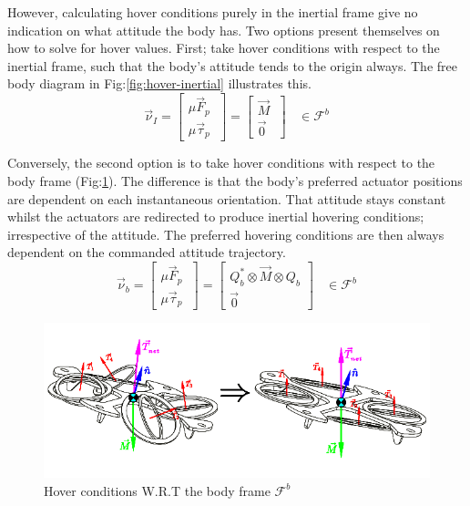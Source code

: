 \par
However, calculating hover conditions purely in the inertial frame give no indication on what attitude the body has. Two options present themselves on how to solve for hover values. First; take hover conditions with respect to the inertial frame, such that the body's attitude tends to the origin always. The free body diagram in Fig:\ref{fig:hover-inertial} illustrates this. 
\begin{equation}\label{eq:hover-inertial}
\vec{\nu}_I=
\begin{bmatrix}
\mu\vec{F}_p\hspace{3pt}\\
\mu\vec{\tau}_p\hspace{3pt}
\end{bmatrix}
=\begin{bmatrix}
\vec{M}\hspace{3pt}\\
\vec{0}\hspace{3pt}
\end{bmatrix}~~~~\in\mathcal{F}^b
\end{equation}
\par
Conversely, the second option is to take hover conditions with respect to the body frame (Fig:\ref{fig:hover-body}). The difference is that the body's preferred actuator positions are dependent on each instantaneous orientation. That attitude stays constant whilst the actuators are redirected to produce inertial hovering conditions; irrespective of the attitude. The preferred hovering conditions are then always dependent on the commanded attitude trajectory.
\begin{equation}\label{eq:hover-body}
\vec{\nu}_b=
\begin{bmatrix}
\mu\vec{F}_p\hspace{3pt}\\
\mu\vec{\tau}_p\hspace{3pt}
\end{bmatrix}
=\begin{bmatrix}
Q_b^*\otimes\vec{M}\otimes Q_b\\
\vec{0}
\end{bmatrix}~~~~\in\mathcal{F}^b
\end{equation}
\begin{figure}[htbp]
\centering
\includegraphics[width=\textwidth]{figs/hover-body}
\caption{Hover conditions W.R.T the body frame $\mathcal{F}^b$}
\label{fig:hover-body}
\end{figure}
